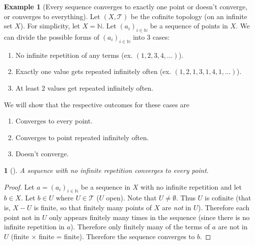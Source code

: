 \documentclass[11pt]{article}
\numberwithin{equation}{section}
\theoremstyle{plain}
\newtheorem{claim}{\color{ForestGreen}{\textbf{Claim}}}[section]
\theoremstyle{definition}
\newtheorem{example}{\color{WildStrawberry}Example}[section]
\newcommand{\1}{\mathbbm 1}
\newcommand{\NN}{\mathbb N}
\newcommand{\tT}{\mathcal T}
\begin{document}
\begin{example}[Every sequence converges to exactly one point or doesn't converge, or converges to everything]
	Let $(X,\tT)$ be the cofinite topology (on an infinite set $X$). For simplicity, let $X = \NN$. Let $(a_i)_{i \in \NN}$ be a sequence of points in $X$. We can divide the possible forms of $(a_i)_{i \in \NN}$ into 3 cases:
	\begin{enumerate}
		\item No infinite repetition of any terms (ex. $(1,2,3,4,\ldots)$).
		\item Exactly one value gets repeated infinitely often (ex. $(1,2,1,3,1,4,1,\ldots)$).
		\item At least $2$ values get repeated infinitely often.
	\end{enumerate}
	We will show that the respective outcomes for these cases are
	\begin{enumerate}
		\item Converges to every point.
		\item Converges to point repeated infinitely often.
		\item Doesn't converge.
	\end{enumerate}

	\begin{claim}[]
		A sequence with no infinite repetition converges to every point.
	\end{claim}
	\begin{proof}
		 Let $a=(a_i)_{i \in \NN}$ be a sequence in $X$ with no infinite repetition and let $b \in X$. Let $b \in U$ where $U \in \tT$ ($U$ open). Note that $U \neq \emptyset$. Thus $U$ is cofinite (that is, $X-U$ is finite, so that finitely many points of $X$ are \emph{not} in $U$). Therefore each point not in $U$ only appears finitely many times in the sequence (since there is no infinite repetition in $a$). Therefore only finitely many of the terms of $a$ are not in $U$ (finite $\times$ finite = finite). Therefore the sequence converges to $b$. 
	\end{proof}
	
	
\end{example}
\end{document}
